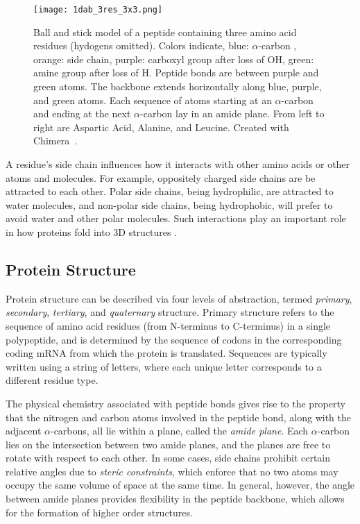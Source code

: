 \begin{figure}
	\centering
	\texttt{[image: 1dab\_3res\_3x3.png]}
	\caption{Ball and stick model of a peptide containing three amino acid residues (hydogens omitted). Colors indicate, blue: $\alpha$-carbon , orange: side chain, purple: carboxyl group after loss of OH, green: amine group after loss of H. Peptide bonds are between purple and green atoms. The backbone extends horizontally along blue, purple, and green atoms. Each sequence of atoms starting at an $\alpha$-carbon and ending at the next $\alpha$-carbon lay in an amide plane. From left to right are Aspartic Acid, Alanine, and Leucine. Created with Chimera~\cite{pettersen2004}.}
	\label{fig:3res}
\end{figure}

A residue's side chain influences how it interacts with other amino acids or other atoms and molecules. 
For example, oppositely charged side chains are be attracted to each other.
Polar side chains, being hydrophilic, are attracted to water molecules, and non-polar side chains, being hydrophobic, will prefer to avoid water and other polar molecules.
Such interactions play an important role in how proteins fold into 3D structures \cite{scheeffink2003}.



\subsection{Protein Structure}

Protein structure can be described via four levels of abstraction, termed \textit{primary}, \textit{secondary}, \textit{tertiary}, and \textit{quaternary} structure.
Primary structure refers to the sequence of amino acid residues (from N-terminus to C-terminus) in a single polypeptide, and is determined by the sequence of codons in the corresponding coding mRNA from which the protein is translated.
Sequences are typically written using a string of letters, where each unique letter corresponds to a different residue type. 

The physical chemistry associated with peptide bonds gives rise to the property that the nitrogen and carbon atoms involved in the peptide bond, along with the adjacent $\alpha$-carbons, all lie within a plane, called the \textit{amide plane}.
Each $\alpha$-carbon lies on the intersection between two amide planes, and the planes are free to rotate with respect to each other. 
In some cases, side chains prohibit certain relative angles due to \textit{steric constraints}, which enforce that no two atoms may occupy the same volume of space at the same time.
In general, however, the angle between amide planes provides flexibility in the peptide backbone, which allows for the formation of higher order structures.

